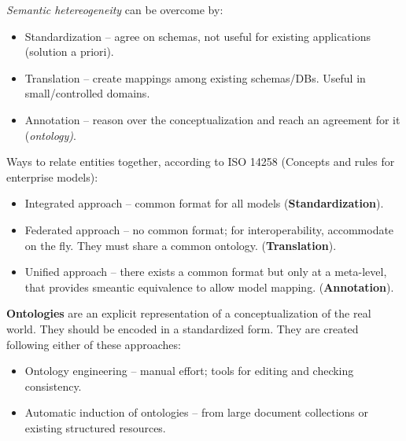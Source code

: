 	\emph{Semantic hetereogeneity} can be overcome by:
	\begin{itemize}
		\item Standardization -- agree on schemas, not useful for existing applications (solution a priori).
		\item Translation -- create mappings among existing schemas/DBs. Useful in small/controlled domains.
		\item Annotation -- reason over the conceptualization and reach an agreement for it (\emph{ontology)}.
	\end{itemize}
	Ways to relate entities together, according to ISO 14258 (Concepts and rules for enterprise models):
	\begin{itemize}
		\item Integrated approach -- common format for all models (\textbf{Standardization}).
		\item Federated approach -- no common format; for interoperability, accommodate on the fly. They must share a common ontology. (\textbf{Translation}).
		\item Unified approach -- there exists a common format but only at a meta-level, that provides smeantic equivalence to allow model mapping. (\textbf{Annotation}).
	\end{itemize}

	\textbf{Ontologies} are an explicit representation of a conceptualization of the real world. They should be encoded in a standardized form. They are created following either of these approaches:
	\begin{itemize}
		\item Ontology engineering -- manual effort; tools for editing and checking consistency.
		\item Automatic induction of ontologies -- from large document collections or existing structured resources.
	\end{itemize}

